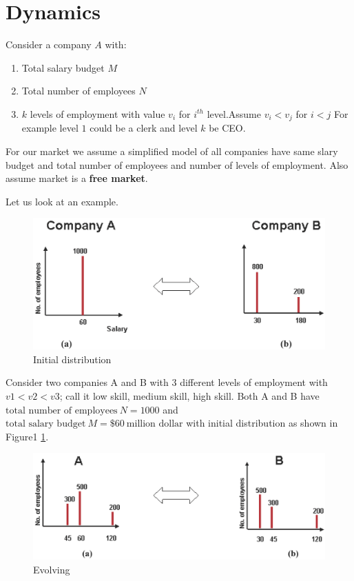 \documentclass[letterpaper,english,10pt]{article}
\begin{document}
\section{Dynamics} \cite{fairentrop}
 Consider a company $A$ with:
\begin{enumerate}
	 \item Total salary budget $M$ 
	 \item Total number of employees $N$
	 \item $k$ levels of employment with value $v_i$ for $i^{th}$ level.Assume $v_i < v_j$ for $i<j$
	 For example level $1$ could be a clerk and level $k$ be CEO.
\end{enumerate}

For our market we assume a simplified model of all companies have same  slary budget and total number of employees and number of levels of employment. Also assume market is a \textbf{free market}.

Let us look at an example.
\begin{figure}[h!]
	\includegraphics[width=\linewidth]{dynamics1.png}
	\caption{Initial distribution}
	\label{fig:1}
\end{figure}

Consider two companies A and B with 3 different levels of employment with $v1<v2<v3$; call it low skill, medium skill, high skill.
Both A and B have $\text{total number of employees} ~ N =1000$ and $\text{total salary budget}~ M=\$60~ \text{million dollar}$ with initial distribution as shown in Figure1 \ref{fig:1}.

\begin{figure}[h!] \label{fig2}
	\includegraphics[width=\linewidth]{dynamics2.png}
	\caption{Evolving}
	\label{fig:2}
\end{figure}
\end{document}
